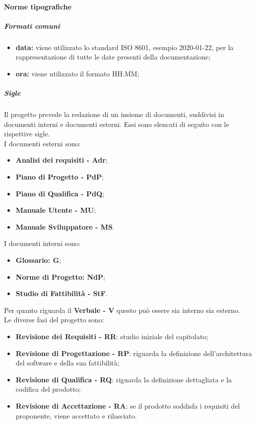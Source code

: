 			\paragraph{Norme tipografiche}
				\subparagraph{Formati comuni}
					\begin{itemize}
						\item \textbf{data:} viene utilizzato lo standard ISO 8601, esempio 2020-01-22, per la rappresentazione di tutte le date presenti della documentazione;
						\item \textbf{ora:} viene utilizzato il formato HH:MM;
					\end{itemize}
				\subparagraph{Sigle}
				Il progetto prevede la redazione di un insieme di documenti, suddivisi in documenti interni e documenti esterni. Essi sono elencati di seguito con le rispettive sigle.\\
				I documenti esterni sono:
				\begin{itemize}
				\item \textbf{Analisi dei requisiti - Adr};
				\item \textbf{Piano di Progetto - PdP};
				\item \textbf{Piano di Qualifica - PdQ};
				\item \textbf{Manuale Utente - MU};
				\item \textbf{Manuale Sviluppatore - MS}.
				\end{itemize}
				I documenti interni sono:
				\begin{itemize}
				\item \textbf{Glossario: G};
				\item \textbf{Norme di Progetto: NdP};
				\item \textbf{Studio di Fattibilità - StF}.
				\end{itemize}
				Per quanto riguarda il \textbf{Verbale - V} questo può essere sia interno sia esterno.
\\
				Le diverse fasi del progetto sono: 
				\begin{itemize}
				\item \textbf{Revisione dei Requisiti - RR}: studio iniziale del capitolato;
				\item \textbf{Revisione di Progettazione - RP}: riguarda la definizione dell'architettura del software e della sua fattibilità;
				\item \textbf{Revisione di Qualifica - RQ}: riguarda la definizione dettagliata e la codifica del prodotto;
				\item \textbf{Revisione di Accettazione - RA}: se il prodotto soddisfa i requisiti del proponente, viene accettato e rilasciato.
				\end{itemize}
